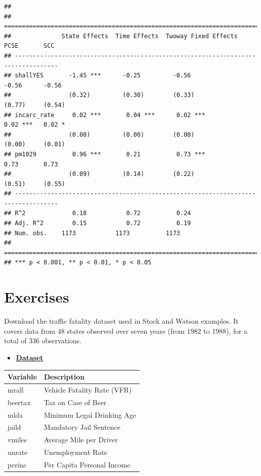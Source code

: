 \documentclass[]{article}
\providecommand{\tightlist}{%
  \setlength{\itemsep}{0pt}\setlength{\parskip}{0pt}}
\theoremstyle{definition}
\theoremstyle{definition}
\theoremstyle{remark}
\begin{document}
\begin{verbatim}
## 
## ==================================================================================
##              State Effects  Time Effects  Twoway Fixed Effects  PCSE       SCC    
## ----------------------------------------------------------------------------------
## shallYES       -1.45 ***      -0.25         -0.56               -0.56      -0.56  
##                (0.32)         (0.30)        (0.33)              (0.77)     (0.54) 
## incarc_rate     0.02 ***       0.04 ***      0.02 ***            0.02 ***   0.02 *
##                (0.00)         (0.00)        (0.00)              (0.00)     (0.01) 
## pm1029          0.96 ***       0.21          0.73 ***            0.73       0.73  
##                (0.09)         (0.14)        (0.22)              (0.51)     (0.55) 
## ----------------------------------------------------------------------------------
## R^2             0.18           0.72          0.24                                 
## Adj. R^2        0.15           0.72          0.19                                 
## Num. obs.    1173           1173          1173                                    
## ==================================================================================
## *** p < 0.001, ** p < 0.01, * p < 0.05
\end{verbatim}

\section{Exercises}\label{exercises}

Download the traffic fatality dataset used in Stock and Watson examples.
It covers data from 48 states observed over seven years (from 1982 to
1988), for a total of 336 observations.

\begin{itemize}
\tightlist
\item
  \textbf{\href{https://altaf-ali.github.io/panel_data_models/data/fatality.dta}{Dataset}}
\end{itemize}

\begin{longtable}[c]{@{}ll@{}}
\toprule
Variable & Description\tabularnewline
\midrule
\endhead
mrall & Vehicle Fatality Rate (VFR)\tabularnewline
beertax & Tax on Case of Beer\tabularnewline
mlda & Minimum Legal Drinking Age\tabularnewline
jaild & Mandatory Jail Sentence\tabularnewline
vmiles & Average Mile per Driver\tabularnewline
unrate & Unemployment Rate\tabularnewline
perinc & Per Capita Personal Income\tabularnewline
\bottomrule
\end{longtable}
\end{document}
